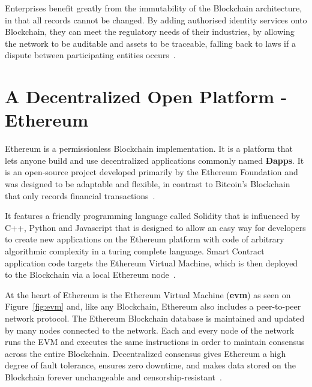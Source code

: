 Enterprises benefit greatly from the immutability of the Blockchain
architecture, in that all records cannot be changed. By adding authorised
identity services onto Blockchain, they can meet the regulatory needs of their
industries, by allowing the network to be auditable and assets to be traceable,
falling back to laws if a dispute between participating entities
occurs~\cite{Barclay2017}.


\section{A Decentralized Open Platform - Ethereum}

Ethereum is a permissionless Blockchain implementation. It is a platform that
lets anyone build and use decentralized applications commonly named
\textbf{Ðapps}. It is an open-source project developed primarily by the
Ethereum Foundation and was designed to be adaptable and flexible, in contrast
to Bitcoin's Blockchain that only records financial
transactions~\cite{EthereumDocs2018}.

It features a friendly programming language called Solidity that is influenced
by C++, Python and Javascript that is designed to allow an easy way for
developers to create new applications on the Ethereum platform with code of
arbitrary algorithmic complexity in a turing complete language. Smart Contract
application code targets the Ethereum Virtual Machine, which is then deployed
to the Blockchain via a local Ethereum node~\cite{Wood2017,Barclay2017}.

At the heart of Ethereum is the Ethereum Virtual Machine (\textbf{evm}) as seen
on Figure~\ref{fig:evm} and, like any Blockchain, Ethereum also includes a
peer-to-peer network protocol. The Ethereum Blockchain database is maintained
and updated by many nodes connected to the network. Each and every node of the
network runs the EVM and executes the same instructions in order to maintain
consensus across the entire Blockchain. Decentralized consensus gives Ethereum
a high degree of fault tolerance, ensures zero downtime, and makes data stored
on the Blockchain forever unchangeable and
censorship-resistant~\cite{EthereumDocs2018}.

